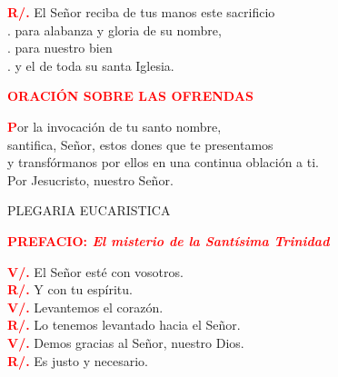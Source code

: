 \documentclass[12pt, letterpaper, spanish]{report}
\begin{document}
\Large \hspace{-0.9cm} {\bfseries \textcolor{red}{R/.}} \hspace{0.5cm} El Se\~nor reciba de tus manos este sacrificio \\
.\hspace{1.5cm} para alabanza y gloria de su nombre, \\
.\hspace{1.5cm} para nuestro bien \\
.\hspace{1.5cm} y el de toda su santa Iglesia. \newline

\Large {\bfseries \textcolor{red}{ORACI\'ON SOBRE LAS OFRENDAS}}

\Large \lettrine[lines=1]{\bfseries \textcolor{red}{P}}{}or la invocaci\'on de tu santo nombre, \\
santifica, Se\~nor, estos dones que te presentamos \\
y transf\'ormanos por ellos en una continua oblaci\'on a ti. \\
Por Jesucristo, nuestro Se\~nor. \newline

\begin{center}
\Large PLEGARIA EUCARISTICA
\end{center}

\Large {\bfseries \textcolor{red}{PREFACIO: \em \large El misterio de la Sant\'isima Trinidad}} \newline

\Large \hspace{-0.9cm} {\bfseries \textcolor{red}{V/.}} \hspace{0.5cm} El Se\~nor est\'e con vosotros. \\
\Large \hspace{-0.9cm} {\bfseries \textcolor{red}{R/.}} \hspace{0.5cm} Y con tu esp\'iritu. \\

\Large \hspace{-0.9cm} {\bfseries \textcolor{red}{V/.}} \hspace{0.5cm} Levantemos el coraz\'on. \\
\Large \hspace{-0.9cm} {\bfseries \textcolor{red}{R/.}} \hspace{0.5cm} Lo tenemos levantado hacia el Se\~nor. \\

\Large \hspace{-0.9cm} {\bfseries \textcolor{red}{V/.}} \hspace{0.5cm} Demos gracias al Se\~nor, nuestro Dios. \\
\Large \hspace{-0.9cm} {\bfseries \textcolor{red}{R/.}} \hspace{0.5cm} Es justo y necesario.
\end{document}
